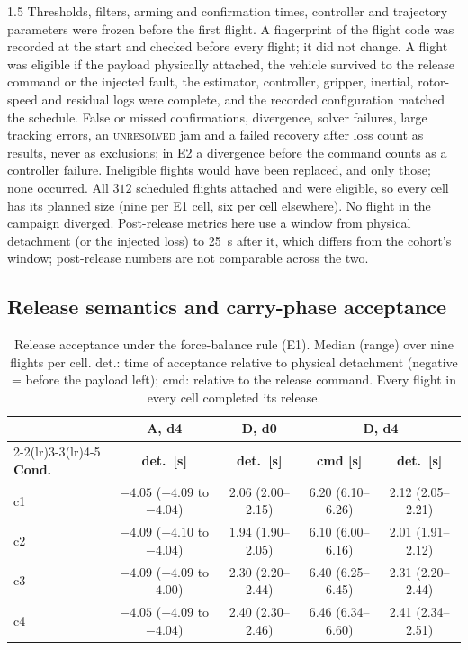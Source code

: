 \begin{spacing}{1.5}
Thresholds, filters, arming and confirmation times, controller and trajectory
parameters were frozen before the first flight. A fingerprint of the flight code
was recorded at the start and checked before every flight; it did not change.
A flight was eligible if the payload physically attached, the vehicle survived
to the release command or the injected fault, the estimator, controller,
gripper, inertial, rotor-speed and residual logs were complete, and the
recorded configuration matched the schedule. False or missed confirmations,
divergence, solver failures, large tracking errors, an \textsc{unresolved}
jam and a failed recovery after loss count as results, never as exclusions; in
E2 a divergence before the command counts as a controller failure. Ineligible
flights would have been replaced, and only those; none occurred. All $312$
scheduled flights attached and were eligible, so every cell has its planned size
(nine per E1 cell, six per cell elsewhere). No flight in the campaign diverged.
Post-release metrics here use a window from physical detachment (or the
injected loss) to \SI{25}{\second} after it, which differs from the cohort's
window; post-release numbers are not comparable across the two.

\subsection{Release semantics and carry-phase acceptance}\label{sec:eval:camp:release}

\begin{table}[ht]
\centering
\caption[Release acceptance under the force-balance rule (E1)]{Release
acceptance under the force-balance rule (E1). Median (range) over nine flights
per cell. det.: time of acceptance relative to physical detachment (negative =
before the payload left); cmd: relative to the release command.
Every flight in every cell completed its release.}
\label{tab:camp-release}
\small
\begin{tabular}{@{}l c c c c@{}}
\toprule
& \textbf{A, d4} & \textbf{D, d0} & \multicolumn{2}{c}{\textbf{D, d4}} \\
\cmidrule(lr){2-2}\cmidrule(lr){3-3}\cmidrule(lr){4-5}
\textbf{Cond.} & \textbf{det.\ [s]} & \textbf{det.\ [s]} &
\textbf{cmd [s]} & \textbf{det.\ [s]} \\
\midrule
c1 & $-4.05$ ($-4.09$ to $-4.04$) & 2.06 (2.00--2.15) & 6.20 (6.10--6.26) & 2.12 (2.05--2.21) \\
c2 & $-4.09$ ($-4.10$ to $-4.04$) & 1.94 (1.90--2.05) & 6.10 (6.00--6.16) & 2.01 (1.91--2.12) \\
c3 & $-4.09$ ($-4.09$ to $-4.00$) & 2.30 (2.20--2.44) & 6.40 (6.25--6.45) & 2.31 (2.20--2.44) \\
c4 & $-4.05$ ($-4.09$ to $-4.04$) & 2.40 (2.30--2.46) & 6.46 (6.34--6.60) & 2.41 (2.34--2.51) \\
\bottomrule
\end{tabular}
\end{table}


\end{spacing}
